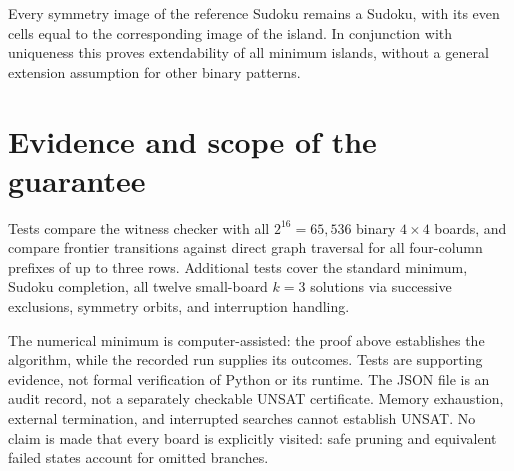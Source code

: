 \documentclass[11pt,a4paper]{article}
\begin{document}
Every symmetry image of the reference Sudoku remains a Sudoku, with its
even cells equal to the corresponding image of the island. In conjunction
with uniqueness this proves extendability of all minimum islands, without
a general extension assumption for other binary patterns.

\section{Evidence and scope of the guarantee}
Tests compare the witness checker with all $2^{16}=65,536$ binary $4\times4$
boards, and compare frontier transitions against direct graph traversal for
all four-column prefixes of up to three rows. Additional tests cover the
standard minimum, Sudoku completion, all twelve small-board $k=3$ solutions
via successive exclusions, symmetry orbits, and interruption handling.

The numerical minimum is computer-assisted: the proof above establishes the
algorithm, while the recorded run supplies its outcomes. Tests are supporting
evidence, not formal verification of Python or its runtime. The JSON file is
an audit record, not a separately checkable UNSAT certificate. Memory exhaustion,
external termination, and interrupted searches cannot establish UNSAT.
No claim is made that every board is explicitly visited: safe pruning and
equivalent failed states account for omitted branches.
\end{document}
